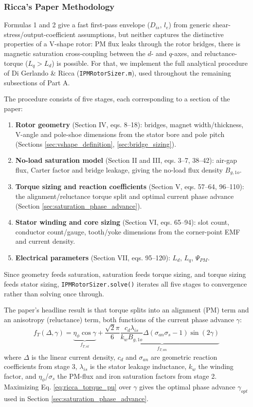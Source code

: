 \documentclass[11pt,a4paper]{article}
\begin{document}
\subsubsection{Ricca's Paper Methodology}
\label{sec:ricca_methodology}
Formulas 1 and 2 give a fast first-pass envelope ($D_{is}$, $l_e$) from generic shear-stress/output-coefficient assumptions, but neither captures the distinctive properties of a V-shape rotor: PM flux leaks through the rotor bridges, there is magnetic saturation cross-coupling between the $d$- and $q$-axes, and reluctance-torque ($L_q>L_d$) is possible. For that, we implement the full analytical procedure of Di Gerlando \& Ricca \cite{DiGerlandoRicca2022} (\texttt{IPMRotorSizer.m}), used throughout the remaining subsections of Part A.

The procedure consists of five stages, each corresponding to a section of the paper:
\begin{enumerate}
    \item \textbf{Rotor geometry} (Section IV, eqs. 8--18): bridges, magnet width/thickness, V-angle and pole-shoe dimensions from the stator bore and pole pitch (Sections \ref{sec:vshape_definition}, \ref{sec:bridge_sizing}).
    \item \textbf{No-load saturation model} (Section II and III, eqs. 3--7, 38--42): air-gap flux, Carter factor and bridge leakage, giving the no-load flux density $B_{g,1o}$.
    \item \textbf{Torque sizing and reaction coefficients} (Section V, eqs. 57--64, 96--110): the alignment/reluctance torque split and optimal current phase advance (Section \ref{sec:saturation_phase_advance}).
    \item \textbf{Stator winding and core sizing} (Section VI, eqs. 65--94): slot count, conductor count/gauge, tooth/yoke dimensions from the corner-point EMF and current density.
    \item \textbf{Electrical parameters} (Section VII, eqs. 95--120): $L_d$, $L_q$, $\Psi_{PM}$.
\end{enumerate}
Since geometry feeds saturation, saturation feeds torque sizing, and torque sizing feeds stator sizing, \texttt{IPMRotorSizer.solve()} iterates all five stages to convergence rather than solving once through.

The paper's headline result is that torque splits into an alignment (PM) term and an anisotropy (reluctance) term, both functions of the current phase advance $\gamma$:
\begin{equation}
\label{eq:ricca_torque_pu}
f_T(\Delta,\gamma) = \underbrace{\eta_{\phi}\cos\gamma}_{f_{T,al}} + \underbrace{\frac{\sqrt{2}\pi}{6}\frac{c_d\lambda_{is}}{k_w B_{g,1o}}\Delta\left(\sigma_{an}\sigma_s-1\right)\sin(2\gamma)}_{f_{T,an}}
\end{equation}
where $\Delta$ is the linear current density, $c_d$ and $\sigma_{an}$ are geometric reaction coefficients from stage 3, $\lambda_{is}$ is the stator leakage inductance, $k_w$ the winding factor, and $\eta_\phi$/$\sigma_s$ the PM-flux and iron saturation factors from stage 2. Maximizing Eq. \ref{eq:ricca_torque_pu} over $\gamma$ gives the optimal phase advance $\gamma_{opt}$ used in Section \ref{sec:saturation_phase_advance}.
\end{document}
